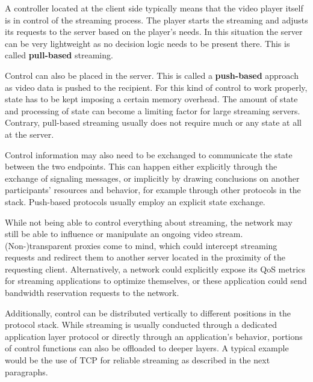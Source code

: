 A controller located at the client side typically means that the video player itself is in control of the streaming process. The player starts the streaming and adjusts its requests to the server based on the player's needs. In this situation the server can be very lightweight as no decision logic needs to be present there. This is called \textbf{pull-based} streaming.

Control can also be placed in the server. This is called a \textbf{push-based} approach as video data is pushed to the recipient. For this kind of control to work properly, state has to be kept imposing a certain memory overhead. The amount of state and processing of state can become a limiting factor for large streaming servers. Contrary, pull-based streaming usually does not require much or any state at all at the server.

Control information may also need to be exchanged to communicate the state between the two endpoints. This can happen either explicitly through the exchange of signaling messages, or implicitly by drawing conclusions on another participants' resources and behavior, for example through other protocols in the stack. Push-based protocols usually employ an explicit state exchange.

While not being able to control everything about streaming, the network may still be able to influence or manipulate an ongoing video stream. (Non-)transparent proxies come to mind, which could intercept streaming requests and redirect them to another server located in the proximity of the requesting client. Alternatively, a network could explicitly expose its \gls{QoS} metrics for streaming applications to optimize themselves, or these application could send bandwidth reservation requests to the network.

Additionally, control can be distributed vertically to different positions in the protocol stack. While streaming is usually conducted through a dedicated application layer protocol or directly through an application's behavior, portions of control functions can also be offloaded to deeper layers. A typical example would be the use of \gls{TCP} for reliable streaming as described in the next paragraphs.


